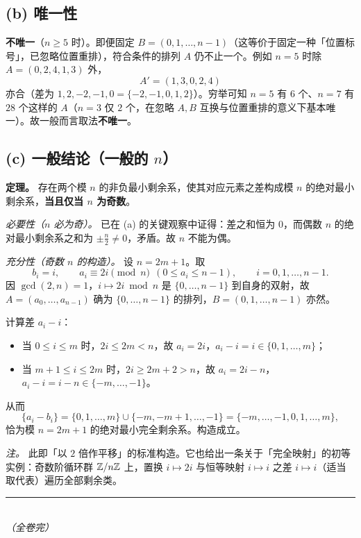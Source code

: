\documentclass{article}
\begin{document}
\subsection*{(b) 唯一性}

\begin{solution}
\textbf{不唯一}（$n\ge 5$ 时）。即便固定 $B=(0,1,\dots,n-1)$（这等价于固定一种「位置标号」，已忽略位置重排），符合条件的排列 $A$ 仍不止一个。例如 $n=5$ 时除 $A=(0,2,4,1,3)$ 外，
\[
  A'=(1,3,0,2,4)
\]
亦合（差为 $1,2,-2,-1,0=\{-2,-1,0,1,2\}$）。穷举可知 $n=5$ 有 $6$ 个、$n=7$ 有 $28$ 个这样的 $A$（$n=3$ 仅 $2$ 个，在忽略 $A,B$ 互换与位置重排的意义下基本唯一）。故一般而言取法\textbf{不唯一}。
\end{solution}

\subsection*{(c) 一般结论（一般的 $n$）}

\begin{solution}
\textbf{定理。} 存在两个模 $n$ 的非负最小剩余系，使其对应元素之差构成模 $n$ 的绝对最小剩余系，\textbf{当且仅当 $n$ 为奇数}。

\smallskip
\noindent\textit{必要性（$n$ 必为奇）。} 已在 (a) 的关键观察中证得：差之和恒为 $0$，而偶数 $n$ 的绝对最小剩余系之和为 $\pm\frac n2\ne0$，矛盾。故 $n$ 不能为偶。

\smallskip
\noindent\textit{充分性（奇数 $n$ 的构造）。} 设 $n=2m+1$。取
\[
  b_i=i,\qquad a_i\equiv 2i\pmod n\ \ (0\le a_i\le n-1),\qquad i=0,1,\dots,n-1.
\]
因 $\gcd(2,n)=1$，$i\mapsto 2i\bmod n$ 是 $\{0,\dots,n-1\}$ 到自身的双射，故 $A=(a_0,\dots,a_{n-1})$ 确为 $\{0,\dots,n-1\}$ 的排列，$B=(0,1,\dots,n-1)$ 亦然。

计算差 $a_i-i$：
\begin{itemize}
  \item 当 $0\le i\le m$ 时，$2i\le 2m<n$，故 $a_i=2i$，$a_i-i=i\in\{0,1,\dots,m\}$；
  \item 当 $m+1\le i\le 2m$ 时，$2i\ge 2m+2>n$，故 $a_i=2i-n$，$a_i-i=i-n\in\{-m,\dots,-1\}$。
\end{itemize}
从而
\[
  \{a_i-b_i\}=\{0,1,\dots,m\}\cup\{-m,-m+1,\dots,-1\}=\{-m,\dots,-1,0,1,\dots,m\},
\]
恰为模 $n=2m+1$ 的绝对最小完全剩余系。构造成立。

\smallskip
\noindent\textit{注。} 此即「以 $2$ 倍作平移」的标准构造。它也给出一条关于「完全映射」的初等实例：奇数阶循环群 $\mathbb{Z}/n\mathbb{Z}$ 上，置换 $i\mapsto 2i$ 与恒等映射 $i\mapsto i$ 之差 $i\mapsto i$（适当取代表）遍历全部剩余类。
\end{solution}

\bigskip
\begin{center}
\rule{0.4\textwidth}{0.4pt}\\[2pt]
\itshape （全卷完）
\end{center}
\end{document}
